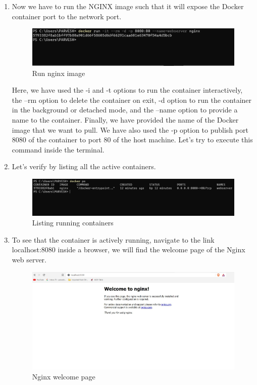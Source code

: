 \documentclass[12pt]{article}
\begin{document}
\begin{enumerate}
 \item Now we have to run the NGINX image such that it will expose the Docker container port to the network port.
 
\begin{figure}[H]
\centering
\includegraphics[scale=0.6]{fig17}
\caption{Run nginx image}
\vspace{0.6\baselineskip}
\end{figure}	

Here, we have used the -i and -t options to run the container interactively, the –rm option to delete the container on exit, -d option to run the container in the background or detached mode, and the –name option to provide a name to the container. Finally, we have provided the name of the Docker image that we want to pull. We have also used the -p option to publish port 8080 of the container to port 80 of the host machine. Let’s try to execute this command inside the terminal.

	\item Let’s verify by listing all the active containers.
	
\begin{figure}[H]
\centering
\includegraphics[scale=0.5]{fig18}
\caption{Listing running containers}
\vspace{0.6\baselineskip}
\end{figure}	

	\item To see that the container is actively running, navigate to the link localhost:8080 inside a browser, we will find the welcome page of the Nginx web server.
	
\begin{figure}[H]
\centering
\includegraphics[scale=0.45]{fig19}
\caption{Nginx welcome page}
\vspace{0.6\baselineskip}
\end{figure}	
 

\end{enumerate}
\end{document}
